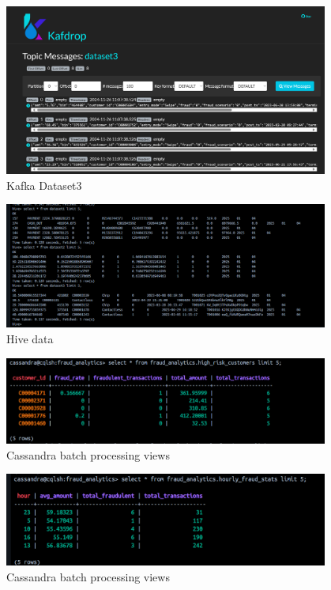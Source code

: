 \documentclass[12pt,a4paper, hidelinks]{article}
\begin{document}
\begin{figure}[h!]
  \centering
  \includegraphics[width=0.95\textwidth]{images/m2-kafka-3.png}
  \caption{Kafka Dataset3}
  \label{fig:kafka3}
\end{figure}


\begin{figure}[h!]
  \centering
  \includegraphics[width=0.95\textwidth]{images/m3-hive-tables.png}
  \caption{Hive data}
  \label{fig:hive1}
\end{figure}



\begin{figure}[h!]
  \centering
  \includegraphics[width=0.95\textwidth]{images/m3-cassandra-batch-1.png}
  \caption{Cassandra batch processing views}
  \label{fig:cassandra-batch-1}
\end{figure}

\begin{figure}[h!]
  \centering
  \includegraphics[width=0.95\textwidth]{images/m3-cassandra-batch-2.png}
  \caption{Cassandra batch processing views}
  \label{fig:cassandra-batch-2}
\end{figure}
\end{document}
